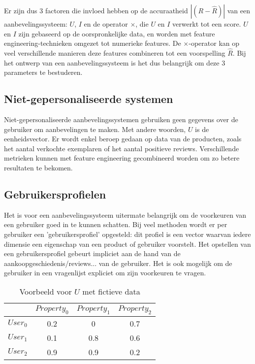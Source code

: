 Er zijn dus 3 factoren die invloed hebben op de accuraatheid $|(R - \hat{R})|$ van een aanbevelingssysteem: $U$, $I$ en de operator $\times$, die $U$ en $I$ verwerkt tot een score. $U$ en $I$ zijn gebaseerd op de oorspronkelijke data, en worden met feature engineering-technieken omgezet tot numerieke features. De $\times$-operator kan op veel verschillende manieren deze features combineren tot een voorspelling $\hat{R}$. Bij het ontwerp van een aanbevelingssysteem is het dus belangrijk om deze 3 parameters te bestuderen.

\subsection{Niet-gepersonaliseerde systemen}
Niet-gepersonaliseerde aanbevelingssystemen gebruiken geen gegevens over de gebruiker om aanbevelingen te maken. Met andere woorden, $U$ is de eenheidsvector. Er wordt enkel beroep gedaan op data van de producten, zoals het aantal verkochte exemplaren of het aantal positieve reviews. Verschillende metrieken kunnen met feature engineering gecombineerd worden om zo betere resultaten te bekomen.

\subsection{Gebruikersprofielen}
Het is voor een aanbevelingssysteem uitermate belangrijk om de voorkeuren van een gebruiker goed in te kunnen schatten. Bij veel methoden wordt er per gebruiker een 'gebruikersprofiel' opgesteld: dit profiel is een vector waarvan iedere dimensie een eigenschap van een product of gebruiker voorstelt. Het opstellen van een gebruikersprofiel gebeurt impliciet aan de hand van de aankoopgeschiedenis/reviews... van de gebruiker. Het is ook mogelijk om de gebruiker in een vragenlijst expliciet om zijn voorkeuren te vragen.

\begin{table}[H]
\centering
\begin{tabular}{c|ccc}
         & $Property_0$ & $Property_1$ & $Property_2$ \\ \hline
$User_0$ & 0.2          & 0            & 0.7          \\
$User_1$ & 0.1          & 0.8          & 0.6          \\
$User_2$ & 0.9          & 0.9          & 0.2         
\end{tabular}
\caption{Voorbeeld voor $U$ met fictieve data}
\label{tab:chap2_user_profiles}
\end{table}

